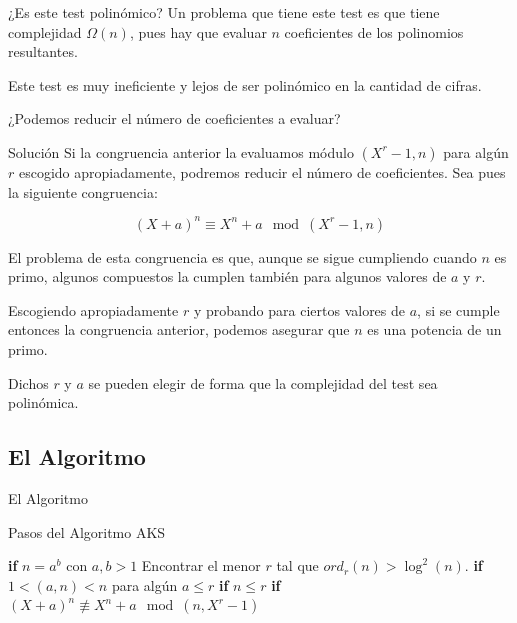 \documentclass{beamer}
\begin{document}
\begin{frame}{¿Es este test polinómico?}
	Un problema que tiene este test es que tiene complejidad $\Omega(n)$, pues hay que evaluar $n$ coeficientes de los polinomios resultantes.\break
	
	Este test es muy ineficiente y lejos de ser polinómico en la cantidad de cifras.\break
	
	¿Podemos reducir el número de coeficientes a evaluar?
\end{frame}

\begin{frame}{Solución}
	\onslide<1->Si la congruencia anterior la evaluamos módulo $(X^r - 1, n)$ para algún $r$ escogido apropiadamente, podremos reducir el número de coeficientes. Sea pues la siguiente congruencia:\break
	
	\begin{equation*}
	(X + a)^n \equiv X^n + a \mod(X^r - 1, n)
	\end{equation*}
	
	El problema de esta congruencia es que, aunque se sigue cumpliendo cuando $n$ es primo, algunos compuestos la cumplen también para algunos valores de $a$ y $r$.\break
	
	Escogiendo apropiadamente $r$ y probando para ciertos valores de $a$, si se cumple entonces la congruencia anterior, podemos asegurar que $n$ es una potencia de un primo.\break
	
	Dichos $r$ y $a$ se pueden elegir de forma que la complejidad del test sea polinómica.
\end{frame}

\subsection{El Algoritmo}

\begin{frame}
	\centering
	\begin{Large}
		El Algoritmo
	\end{Large}
\end{frame}

\begin{frame}[fragile]{Pasos del Algoritmo AKS}
	\begin{algorithm}[H]
		\caption{AKS}
		\begin{algorithmic}
				\State \textbf{if} $n = a^b$ con $a, b > 1$ \medskip
				\State Encontrar el menor $r$ tal que $ord_r(n) > \log^2(n)$.\medskip
				\State \textbf{if} $1 < (a, n) < n$ para algún $a \leq r$ \medskip
				\State \textbf{if} $n \leq r$ \medskip
					\State \textbf{if} $(X + a)^n \not\equiv X^n + a \mod(n, X^r - 1)$ 
				\EndFor\medskip
				\State {}
			\EndProcedure
		\end{algorithmic}
	\end{algorithm}
\end{frame}
\end{document}
